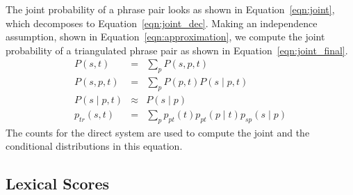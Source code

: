 \documentclass[11pt]{article}
\begin{document}
	The joint probability of a phrase pair looks as shown in Equation~\ref{eqn:joint}, which decomposes to Equation~\ref{eqn:joint_dec}. Making an independence assumption, shown in Equation~\ref{eqn:approximation}, we compute the joint probability of a triangulated phrase pair as shown in Equation~\ref{eqn:joint_final}. 
\begin{eqnarray}
P(s, t) &=& \sum_{p} P(s, p, t) \label{eqn:joint} \\
P(s, p, t) &=& \sum_{p}P(p, t) P(s \mid p, t) \label{eqn:joint_dec} \\
P(s \mid p, t) &\approx& P(s \mid p) \label{eqn:approximation} \\
p_{tr}(s, t) &=& \sum_{p} p_{pt}(t) p_{pt}(p \mid t) p_{sp} (s \mid p) \label{eqn:joint_final}
\end{eqnarray}
The counts for the direct system are used to compute the joint and the conditional distributions in this equation.

\begin{comment}
	\begin{equation} \label{eqn:joint}
		P(s, t) = \sum_{p} P(s, p, t)
	\end{equation}

	\begin{equation} \label{eqn:joint_dec}
		P(s, p, t) = \sum_{p}P(p, t) P(s \mid p, t)
	\end{equation}

	\begin{equation} \label{eqn:approximation}
		P(s \mid p, t) \approx P(s \mid p)
	\end{equation}

	\begin{equation} \label{eqn:joint_final}
		p_{tr}(s, t) = \sum_{p} p_{pt}(t) p_{pt}(p \mid t) p_{sp} (s \mid p)
	\end{equation}
\end{comment}
\begin{comment}
	\begin{eqnarray*}
		p_{tr}(s, t) &=& \sum_{p}p_{sp}(s, p) p_{pt}(p, t) \\
				&=& \sum_{p}p_{sp}(s \mid p) p_{sp}(p) p_{pt}(p \mid t) p_{pt}(t)
	\end{eqnarray*} 
\end{comment}

	
\subsection{Lexical Scores}
\label{sec:lexical_scores}
\end{document}
